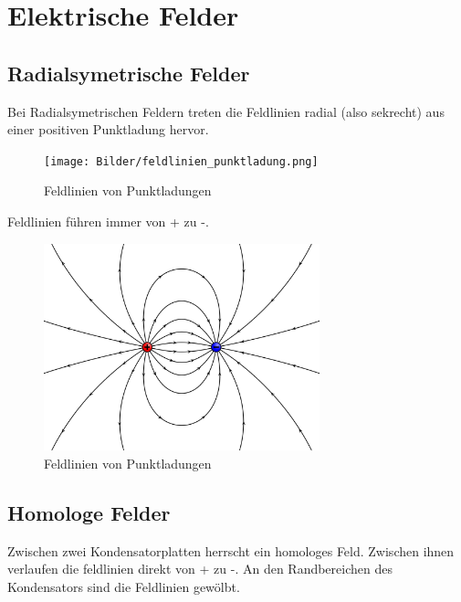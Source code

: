 \documentclass[a4paper]{article}
\begin{document}
\newpage \normalsize


\section{Elektrische Felder}

\subsection{Radialsymetrische Felder}
Bei Radialsymetrischen Feldern treten die Feldlinien radial (also sekrecht)
aus einer positiven Punktladung hervor.

\begin{figure} [h]
	\begin{center}
		\texttt{[image: Bilder/feldlinien\_punktladung.png]}
		\caption{Feldlinien von Punktladungen}
	\end{center}
\end{figure}

Feldlinien führen immer von + zu -.

\begin{figure} [h]
	\begin{center}
		\includegraphics[width=8cm]{Bilder/field.png}
		\caption{Feldlinien von Punktladungen}
	\end{center}
\end{figure}


\newpage
\subsection{Homologe Felder}
Zwischen zwei Kondensatorplatten herrscht ein homologes Feld. Zwischen ihnen verlaufen die feldlinien
direkt von + zu -. An den Randbereichen des Kondensators sind die Feldlinien gewölbt.
\end{document}
